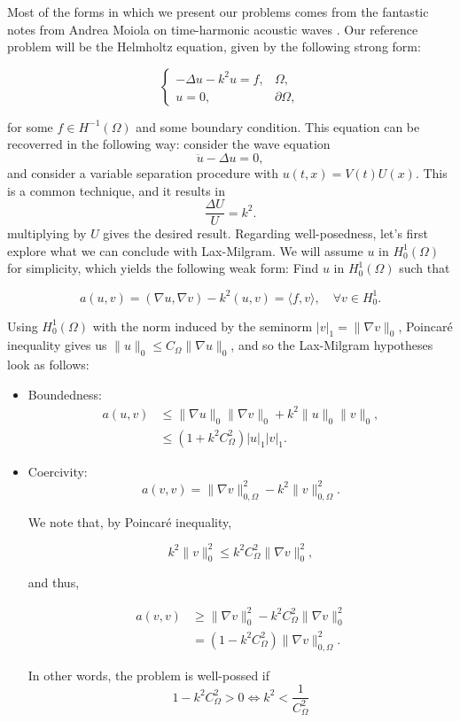 \documentclass{article}
\begin{document}
Most of the forms in which we present our problems comes from the fantastic notes from Andrea Moiola on time-harmonic acoustic waves \cite{moiola2021scattering}. Our reference problem will be the Helmholtz equation, given by the following strong form:

\[
\left\{
\begin{array}{rc}
    -\Delta u -k^2 u = f, &\Omega,\\
    u=0, &\partial\Omega,
\end{array}\right.
\]

for some $f\in H^{-1}(\Omega)$ and some boundary condition. This equation can be recoverred in the following way: consider the wave equation
    $$ \ddot u - \Delta u = 0, $$
and consider a variable separation procedure with $u(t,x) = V(t)U(x)$. This is a common technique, and it results in 
    $$ \frac{\Delta U}{U} = k^2.$$
multiplying by $U$ gives the desired result. Regarding well-posedness, let's first explore what we can conclude with Lax-Milgram. We will assume $u$ in $H_0^1(\Omega)$ for simplicity, which yields the following weak form: Find $u$ in $H_0^1(\Omega)$ such that

\[
a(u,v) = (\nabla u, \nabla v) - k^2(u,v) = \langle f, v\rangle, \quad \forall v\in H_0^1.
\]

Using $H_0^1(\Omega)$ with the norm induced by the seminorm $|v|_1 = \|\nabla v\|_0$, Poincaré inequality gives us $\|u\|_0\leq C_{\Omega}\|\nabla u\|_0$, and so the Lax-Milgram hypotheses look as follows: 

\begin{itemize}
    \item Boundedness: 
    \begin{align*}
        a(u,v) &\leq \|\nabla u\|_0\|\nabla v\|_0 + k^2\|u\|_0\|v\|_0,\\ 
        &\leq (1+k^2C_\Omega^2)|u|_1|v|_1.
    \end{align*}

    \item Coercivity: 
    \begin{equation*}
        a(v,v) = \|\nabla v\|^2_{0,\Omega} - k^2\|v\|^2_{0,\Omega}.
    \end{equation*}

    We note that, by Poincaré inequality,

    \[ k^2\|v\|^2_0 \leq k^2 C^2_{\Omega}\|\nabla v\|^2_0, \]

    and thus,

    \begin{align*}
        a(v,v) &\geq \|\nabla v\|^2_0 - k^2C_\Omega^2\|\nabla v\|^2_0 \\
        &= (1- k^2 C_\Omega^2)\|\nabla v\|^2_{0,\Omega}.
    \end{align*}

    In other words, the problem is well-possed if 
    $$1-k^2C_\Omega^2 > 0 \iff k^2 < \frac{1}{C_\Omega^2}$$
\end{itemize}
\end{document}
